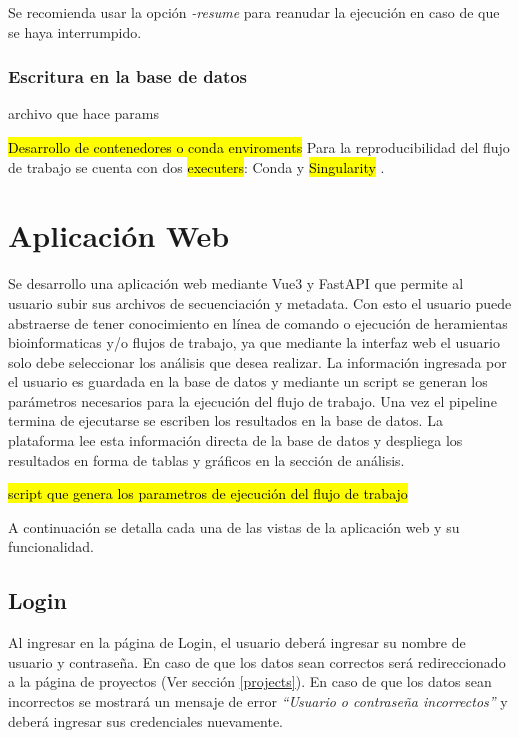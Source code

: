 Se recomienda usar la opción \textit{-resume} para reanudar la ejecución en caso de que se haya interrumpido.

\subsubsection{Escritura en la base de datos}
archivo que hace params

\hl{Desarrollo de contenedores o conda enviroments}
Para la reproducibilidad del flujo de trabajo se cuenta con dos \hl{executers}: Conda y \hl{Singularity}    .


\newpage
\section{Aplicación Web}
Se desarrollo una aplicación web mediante Vue3 y FastAPI que permite al usuario subir sus archivos de secuenciación y metadata. 
Con esto el usuario puede abstraerse de tener conocimiento en línea de comando o ejecución de heramientas bioinformaticas y/o flujos de trabajo, 
ya que mediante la interfaz web el usuario solo debe seleccionar los análisis que desea realizar.
La información ingresada por el usuario es guardada en la base de datos y mediante un script se generan los parámetros necesarios para la ejecución del flujo de trabajo.
Una vez el pipeline termina de ejecutarse se escriben los resultados en la base de datos. 
La plataforma lee esta información directa de la base de datos y despliega los resultados en forma de tablas y gráficos en la sección de análisis.

\hl{script que genera los parametros de ejecución del flujo de trabajo} 

A continuación se detalla cada una de las vistas de la aplicación web y su funcionalidad.

\subsection{Login}
Al ingresar en la página de Login, el usuario deberá ingresar su nombre de usuario y contraseña.
En caso de que los datos sean correctos será redireccionado a la página de proyectos (Ver sección \ref{projects}).
En caso de que los datos sean incorrectos se mostrará un mensaje de error \textit{“Usuario o contraseña incorrectos”} y deberá ingresar sus credenciales nuevamente.



